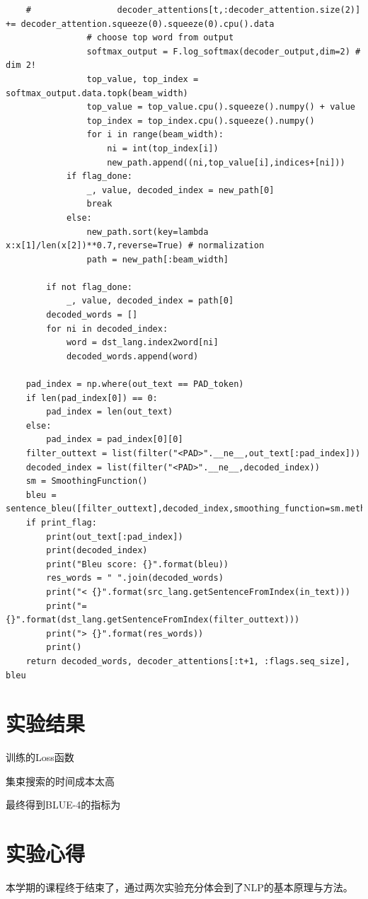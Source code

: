 \documentclass[logo,reportComp]{thesis}
\begin{document}
\begin{lstlisting}
    #                 decoder_attentions[t,:decoder_attention.size(2)] += decoder_attention.squeeze(0).squeeze(0).cpu().data
                # choose top word from output
                softmax_output = F.log_softmax(decoder_output,dim=2) # dim 2!
                top_value, top_index = softmax_output.data.topk(beam_width)
                top_value = top_value.cpu().squeeze().numpy() + value
                top_index = top_index.cpu().squeeze().numpy()
                for i in range(beam_width):
                    ni = int(top_index[i])
                    new_path.append((ni,top_value[i],indices+[ni]))
            if flag_done:
                _, value, decoded_index = new_path[0]
                break
            else:
                new_path.sort(key=lambda x:x[1]/len(x[2])**0.7,reverse=True) # normalization
                path = new_path[:beam_width]

        if not flag_done:
            _, value, decoded_index = path[0]
        decoded_words = []
        for ni in decoded_index:
            word = dst_lang.index2word[ni]
            decoded_words.append(word)

    pad_index = np.where(out_text == PAD_token)
    if len(pad_index[0]) == 0:
        pad_index = len(out_text)
    else:
        pad_index = pad_index[0][0]
    filter_outtext = list(filter("<PAD>".__ne__,out_text[:pad_index]))
    decoded_index = list(filter("<PAD>".__ne__,decoded_index))
    sm = SmoothingFunction()
    bleu = sentence_bleu([filter_outtext],decoded_index,smoothing_function=sm.method4)
    if print_flag:
        print(out_text[:pad_index])
        print(decoded_index)
        print("Bleu score: {}".format(bleu))
        res_words = " ".join(decoded_words)
        print("< {}".format(src_lang.getSentenceFromIndex(in_text)))
        print("= {}".format(dst_lang.getSentenceFromIndex(filter_outtext)))
        print("> {}".format(res_words))
        print()
    return decoded_words, decoder_attentions[:t+1, :flags.seq_size], bleu
\end{lstlisting}

\section{实验结果}
训练的Loss函数

集束搜索的时间成本太高

最终得到BLUE-4的指标为

\section{实验心得}
本学期的课程终于结束了，通过两次实验充分体会到了NLP的基本原理与方法。
\end{document}
